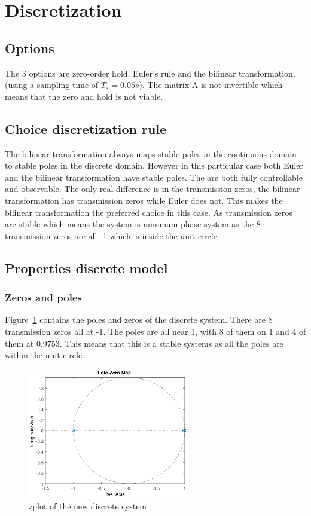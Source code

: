 \section{Discretization}
\subsection{Options}
The 3 options are zero-order hold, Euler's rule and the bilinear transformation. (using a sampling time of $T_s=0.05s$). The matrix A is not invertible which means that the zero and hold is not viable. 

\subsection{Choice discretization rule}
The bilinear transformation always maps stable poles in the continuous domain to stable poles in the discrete domain. However in this particular case both Euler and the bilinear transformation have stable poles. The are both fully controllable and observable. The only real difference is in the transmission zeros, the  bilinear transformation has transmission zeros while Euler does not. This makes the  bilinear transformation the preferred choice in this case. As transmission zeros are stable which means the system is minimum phase system as the 8 transmission zeros are all -1 which is inside the unit circle.

\subsection{Properties discrete model}

\subsubsection{Zeros and poles}

Figure~\ref{fig:zplot_disc} contains the poles and zeros of the discrete system. There are 8 transmission zeros all at -1. The poles are all near 1, with 8 of them on 1 and 4 of them at 0.9753. This means that this is a stable systems as all the poles are within the unit circle.

\begin{figure}[H]
	\centering
	\includegraphics[width=7cm]{./img/discrete/zplot.eps}
	\caption{zplot of the new discrete system}
	\label{fig:zplot_disc}
\end{figure}

